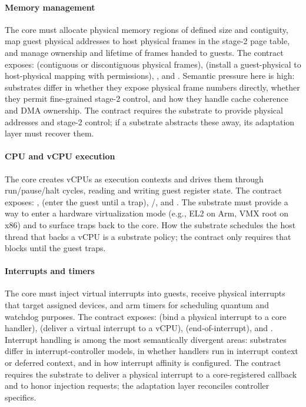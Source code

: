 \paragraph{Memory management}
The core must allocate physical memory regions of defined size and contiguity,
map guest physical addresses to host physical frames in the stage-2 page table,
and manage ownership and lifetime of frames handed to guests. The contract
exposes:  (contiguous or discontiguous physical frames),
 (install a guest-physical to host-physical mapping with
permissions), , and . Semantic pressure
here is high: substrates differ in whether they expose physical frame numbers
directly, whether they permit fine-grained stage-2 control, and how they handle
cache coherence and DMA ownership. The contract requires the substrate to
provide physical addresses and stage-2 control; if a substrate abstracts these
away, its adaptation layer must recover them.

\paragraph{CPU and vCPU execution}
The core creates vCPUs as execution contexts and drives them through
run/pause/halt cycles, reading and writing guest register state. The contract
exposes: ,  (enter the guest until a trap),
/, and . The
substrate must provide a way to enter a hardware virtualization mode (e.g., EL2
on Arm, VMX root on x86) and to surface traps back to the core. How the
substrate schedules the host thread that backs a vCPU is a substrate policy; the
contract only requires that  blocks until the guest traps.

\paragraph{Interrupts and timers}
The core must inject virtual interrupts into guests, receive physical interrupts
that target assigned devices, and arm timers for scheduling quantum and watchdog
purposes. The contract exposes:  (bind a physical interrupt
to a core handler),  (deliver a virtual interrupt to a vCPU),
 (end-of-interrupt), and . Interrupt handling is
among the most semantically divergent areas: substrates differ in
interrupt-controller models, in whether handlers run in interrupt context or
deferred context, and in how interrupt affinity is configured. The contract
requires the substrate to deliver a physical interrupt to a core-registered
callback and to honor injection requests; the adaptation layer reconciles
controller specifics.

